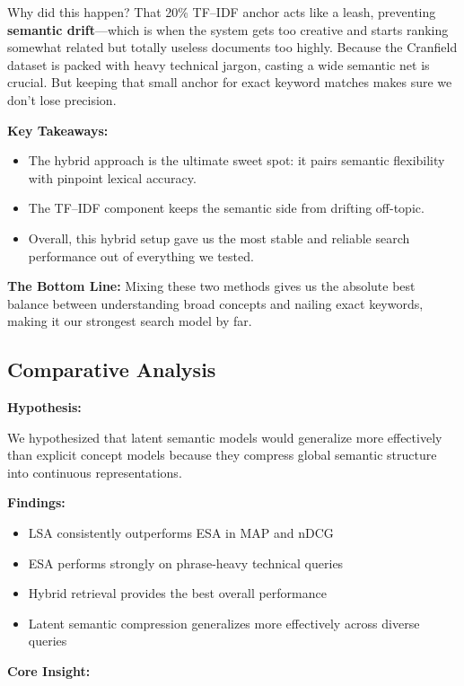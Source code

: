 \documentclass[runningheads]{llncs}
\begin{document}
Why did this happen? That 20\% TF--IDF anchor acts like a leash, preventing \textbf{semantic drift}---which is when the system gets too creative and starts ranking somewhat related but totally useless documents too highly. Because the Cranfield dataset is packed with heavy technical jargon, casting a wide semantic net is crucial. But keeping that small anchor for exact keyword matches makes sure we don't lose precision.

\textbf{Key Takeaways:}
\begin{itemize}
    \item The hybrid approach is the ultimate sweet spot: it pairs semantic flexibility with pinpoint lexical accuracy.
    \item The TF--IDF component keeps the semantic side from drifting off-topic.
    \item Overall, this hybrid setup gave us the most stable and reliable search performance out of everything we tested.
\end{itemize}

\textbf{The Bottom Line:}
Mixing these two methods gives us the absolute best balance between understanding broad concepts and nailing exact keywords, making it our strongest search model by far.
\subsection*{Comparative Analysis}

\textbf{Hypothesis:}

We hypothesized that latent semantic models would generalize more effectively than
explicit concept models because they compress global semantic structure into continuous
representations.

\textbf{Findings:}

\begin{itemize}[noitemsep]
    \item LSA consistently outperforms ESA in MAP and nDCG
    \item ESA performs strongly on phrase-heavy technical queries
    \item Hybrid retrieval provides the best overall performance
    \item Latent semantic compression generalizes more effectively across diverse queries
\end{itemize}

\textbf{Core Insight:}
\end{document}
